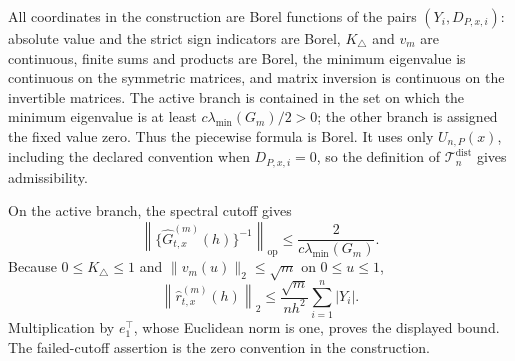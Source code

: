 All coordinates in the construction are Borel functions of the pairs \((Y_i,D_{P,x,i})\): absolute value and the strict sign indicators are Borel, \(K_\triangle\) and \(v_m\) are continuous, finite sums and products are Borel, the minimum eigenvalue is continuous on the symmetric matrices, and matrix inversion is continuous on the invertible matrices.  The active branch is contained in the set on which the minimum eigenvalue is at least \(c\lambda_{\min}(G_m)/2>0\); the other branch is assigned the fixed value zero.  Thus the piecewise formula is Borel.  It uses only \(U_{n,P}(x)\), including the declared convention when \(D_{P,x,i}=0\), so the definition of \(\mathcal T_n^{\mathrm{dist}}\) gives admissibility.

On the active branch, the spectral cutoff gives
\[
 \left\|\{\widehat G^{(m)}_{t,x}(h)\}^{-1}\right\|_{\mathrm{op}}
 \leq\frac{2}{c\lambda_{\min}(G_m)}.
\]
Because \(0\leq K_\triangle\leq1\) and \(\|v_m(u)\|_2\leq\sqrt m\) on \(0\leq u\leq1\),
\[
 \left\|\widehat r^{(m)}_{t,x}(h)\right\|_2
 \leq\frac{\sqrt m}{nh^2}\sum_{i=1}^n|Y_i|.
\]
Multiplication by \(e_1^\top\), whose Euclidean norm is one, proves the displayed bound.  The failed-cutoff assertion is the zero convention in the construction.